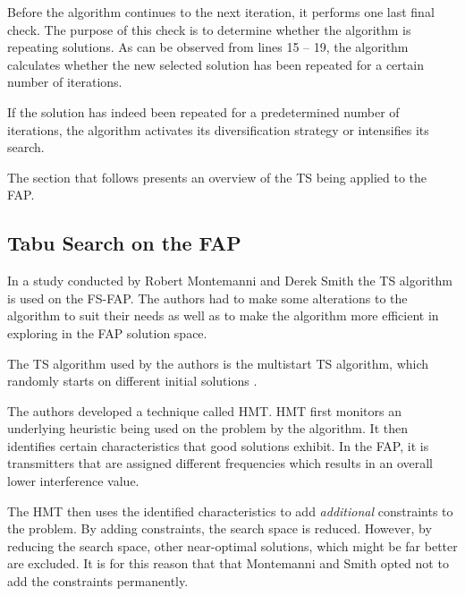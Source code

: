 Before the algorithm continues to the next iteration, it performs one last final check. The purpose of this check is to determine whether the algorithm is repeating solutions. As can be observed from lines 15 -- 19, the algorithm calculates whether the new selected solution has been repeated for a certain number of iterations. 

If the solution has indeed been repeated for a predetermined number of iterations, the algorithm activates its diversification strategy or intensifies its search.

The section that follows presents an overview of the \gls{TS} being applied to the \gls{FAP}.
\subsection{Tabu Search on the \gls{FAP}}
In a study conducted by Robert Montemanni and Derek Smith \cite{TabuMontemanniSmith} the \gls{TS} algorithm is used on the \gls{FS-FAP}. The authors had to make some alterations to the algorithm to suit their needs as well as to make the algorithm more efficient in exploring in the \gls{FAP} solution space.

The \gls{TS} algorithm used by the authors is the multistart \gls{TS} algorithm, which randomly starts on different initial solutions \cite{TabuMontemanniSmith}.

The authors developed a technique called \gls{HMT}. \gls{HMT} first monitors an underlying heuristic being used on the problem by the algorithm\cite{TabuMontemanniSmith}. It then identifies certain characteristics that good solutions exhibit. In the \gls{FAP}, it is transmitters that are assigned different frequencies which results in an overall lower interference value\cite{TabuMontemanniSmith}.

The HMT then uses the identified characteristics to add \emph{additional} constraints to the problem\cite{TabuMontemanniSmith}. By adding constraints, the search space is reduced. However, by reducing the search space, other near-optimal solutions, which might be far better are excluded\cite{TabuMontemanniSmith}. It is for this reason that that Montemanni and Smith opted not to add the constraints permanently.

